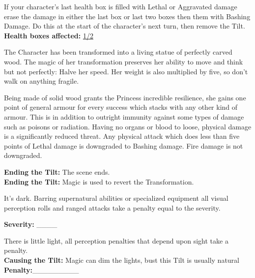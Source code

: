 \documentclass[10pt, frontgrid, backgrid]{flacards}
\begin{document}

{
If your character’s last health box is filled with Lethal or Aggravated damage erase the damage in either the last box or last two boxes then them with Bashing Damage. Do this at the start of the character's next turn, then remove the Tilt. \\ 

\textbf{Health boxes affected:} \underline{1/2}
}

{The Character has been transformed into a living statue of perfectly carved wood. The magic of her transformation preserves her ability to move and think but not perfectly: Halve her speed. Her weight is also multiplied by five, so don't walk on anything fragile. 

Being made of solid wood grants the Princess incredible resilience, she gains one point of general armour for every success which stacks with any other kind of armour. This is in addition to outright immunity against some types of damage such as poisons or radiation. Having no organs or blood to loose, physical damage is a significantly reduced threat. Any physical attack which does less than five points of Lethal damage is downgraded to Bashing damage. Fire damage is not downgraded. 

\textbf{Ending the Tilt:} The scene ends.\\
\textbf{Ending the Tilt:} Magic is used to revert the Transformation.}

{It's dark. Barring supernatural abilities or specialized equipment all visual perception rolls and ranged attacks take a penalty equal to the severity. 

\textbf{Severity:} \_\_\_\_}


{There is little light, all perception penalties that depend upon sight take a penalty. \\

\textbf{Causing the Tilt:} Magic can dim the lights, bust this Tilt is usually natural\\
\textbf{Penalty:}\_\_\_\_\_\_\_\_\_
}
\end{document}
